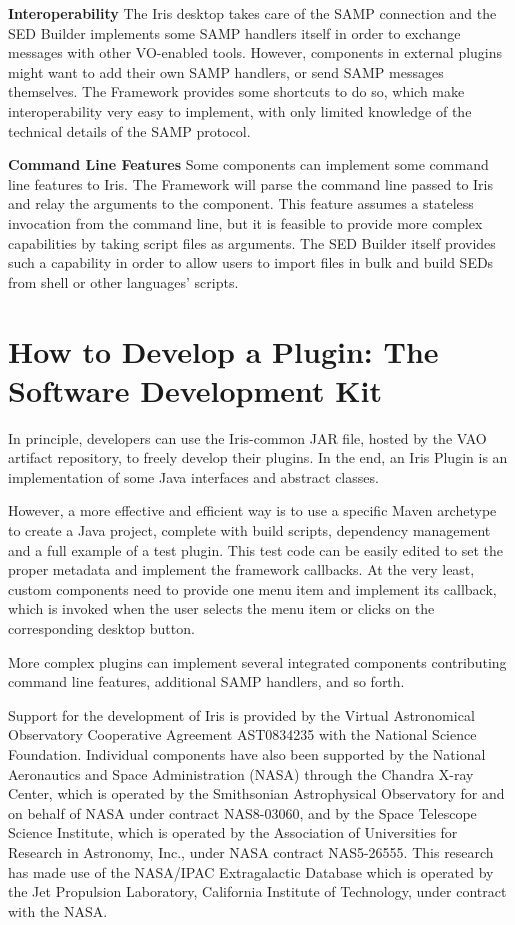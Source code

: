 \textbf{Interoperability}
The Iris desktop takes care of the SAMP connection and the SED Builder implements some SAMP handlers itself in order to exchange messages with other VO-enabled tools. However, components in external plugins might want to add their own SAMP handlers, or send SAMP messages themselves. The Framework provides some shortcuts to do so, which make interoperability very easy to implement, with only limited knowledge of the technical details of the SAMP protocol.

\textbf{Command Line Features}
Some components can implement some command line features to Iris. The Framework will parse the command line passed to Iris and relay the arguments to the component. This feature assumes a stateless invocation from the command line, but it is feasible to provide more complex capabilities by taking script files as arguments. The SED Builder itself provides such a capability in order to allow users to import files in bulk and build SEDs from shell or other languages' scripts.

\section{How to Develop a Plugin: The Software Development Kit}
In principle, developers can use the Iris-common JAR file, hosted by the VAO artifact repository, to freely develop their plugins. In the end, an Iris Plugin is an implementation of some Java interfaces and abstract classes.

However, a more effective and efficient way is to use a specific Maven archetype to create a Java project, complete with build scripts, dependency management and a full example of a test plugin. This test code can be easily edited to set the proper metadata and implement the framework callbacks. At the very least, custom components need to provide one menu item and implement its callback, which is invoked when the user selects the menu item or clicks on the corresponding desktop button.

More complex plugins can implement several integrated components contributing command line features, additional SAMP handlers, and so forth.

\acknowledgements
Support for the development of Iris is provided by the Virtual Astronomical Observatory Cooperative Agreement AST0834235 with the National Science Foundation. Individual components have also been supported by the National Aeronautics and Space Administration (NASA) through the Chandra X-ray Center, which is operated by the Smithsonian Astrophysical Observatory for and on behalf of NASA under contract NAS8-03060,  and by the Space Telescope Science Institute, which is operated by the Association of Universities for Research in Astronomy, Inc., under NASA contract NAS5-26555. This research has made use of the NASA/IPAC Extragalactic Database which is operated by the Jet Propulsion Laboratory, California Institute of Technology, under contract with the NASA.



